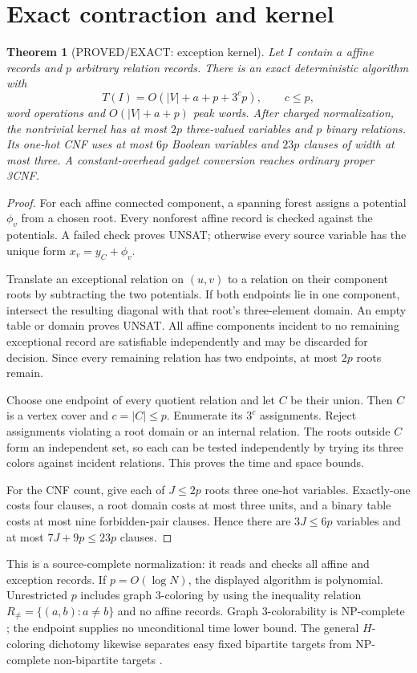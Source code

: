 \documentclass[11pt]{article}
\newtheorem{theorem}{Theorem}
\begin{document}
\section{Exact contraction and kernel}
\begin{theorem}[PROVED/EXACT: exception kernel]
Let $I$ contain $a$ affine records and $p$ arbitrary relation records.
There is an exact deterministic algorithm with
\[
T(I)=O\!\left(|V|+a+p+3^c p\right),\qquad c\le p,
\]
word operations and $O(|V|+a+p)$ peak words. After charged normalization,
the nontrivial kernel has at most $2p$ three-valued variables and $p$
binary relations. Its one-hot CNF uses at most $6p$ Boolean variables and
$23p$ clauses of width at most three. A constant-overhead gadget conversion
reaches ordinary proper 3CNF.
\end{theorem}
\begin{proof}
For each affine connected component, a spanning forest assigns a potential
$\phi_v$ from a chosen root. Every nonforest affine record is checked against
the potentials. A failed check proves UNSAT; otherwise every source variable
has the unique form $x_v=y_C+\phi_v$.

Translate an exceptional relation on $(u,v)$ to a relation on their component
roots by subtracting the two potentials. If both endpoints lie in one
component, intersect the resulting diagonal with that root's three-element
domain. An empty table or domain proves UNSAT. All affine components
incident to no remaining exceptional record are satisfiable independently
and may be discarded for decision. Since every remaining relation has two
endpoints, at most $2p$ roots remain.

Choose one endpoint of every quotient relation and let $C$ be their union.
Then $C$ is a vertex cover and $c=|C|\le p$. Enumerate its $3^c$
assignments. Reject assignments violating a root domain or an internal
relation. The roots outside $C$ form an independent set, so each can be
tested independently by trying its three colors against incident relations.
This proves the time and space bounds.

For the CNF count, give each of $J\le2p$ roots three one-hot variables.
Exactly-one costs four clauses, a root domain costs at most three units, and a
binary table costs at most nine forbidden-pair clauses. Hence there are
$3J\le6p$ variables and at most $7J+9p\le23p$ clauses.
\end{proof}

This is a source-complete normalization: it reads and checks all affine and
exception records. If $p=O(\log N)$, the displayed algorithm is polynomial.
Unrestricted $p$ includes graph 3-coloring by using the inequality relation
$R_{\ne}=\{(a,b):a\ne b\}$ and no affine records. Graph 3-colorability is
NP-complete \cite{gjs}; the endpoint supplies no unconditional time lower
bound. The general $H$-coloring dichotomy likewise separates easy fixed
bipartite targets from NP-complete non-bipartite targets
\cite{hellnesetril}.
\end{document}
